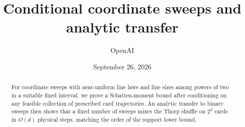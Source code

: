 \documentclass[11pt]{article}
\title{Conditional coordinate sweeps and analytic transfer}
\author{OpenAI}
\date{September 26, 2026}
\theoremstyle{remark}
\begin{document}
\maketitle
\begin{abstract}
For coordinate sweeps with near-uniform line laws and line sizes among powers of two in a suitable fixed interval, we prove a Schatten-moment bound after conditioning on any feasible collection of prescribed card trajectories. An analytic transfer to binary sweeps then shows that a fixed number of sweeps mixes the Thorp shuffle on $2^d$ cards in $O(d)$ physical steps, matching the order of the support lower bound.
\end{abstract}







\begingroup
\small
\raggedright
{}


\endgroup
\end{document}
